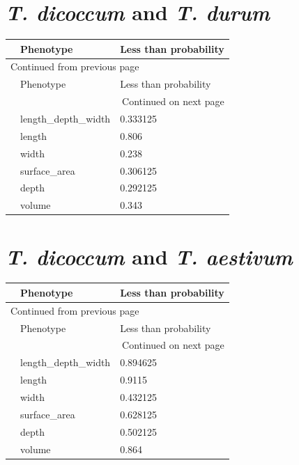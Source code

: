 \documentclass[11pt]{report}
\begin{document}
\section{\emph{T. dicoccum} and \emph{T. durum}}
\label{sec:orgbb0fc9e}
\begin{longtable}{l|l|l}
 & Phenotype & Less than probability\\
\hline
\endfirsthead
\multicolumn{3}{l}{Continued from previous page} \\
\hline

 & Phenotype & Less than probability \\

\hline
\endhead
\hline\multicolumn{3}{r}{Continued on next page} \\
\endfoot
\endlastfoot
\hline
 & length\_depth\_width & 0.333125\\
 & length & 0.806\\
 & width & 0.238\\
 & surface\_area & 0.306125\\
 & depth & 0.292125\\
 & volume & 0.343\\
\end{longtable}

\section{\emph{T. dicoccum} and \emph{T. aestivum}}
\label{sec:orgf307257}
\begin{longtable}{l|l|l}
 & Phenotype & Less than probability\\
\hline
\endfirsthead
\multicolumn{3}{l}{Continued from previous page} \\
\hline

 & Phenotype & Less than probability \\

\hline
\endhead
\hline\multicolumn{3}{r}{Continued on next page} \\
\endfoot
\endlastfoot
\hline
 & length\_depth\_width & 0.894625\\
 & length & 0.9115\\
 & width & 0.432125\\
 & surface\_area & 0.628125\\
 & depth & 0.502125\\
 & volume & 0.864\\
\end{longtable}
\end{document}
